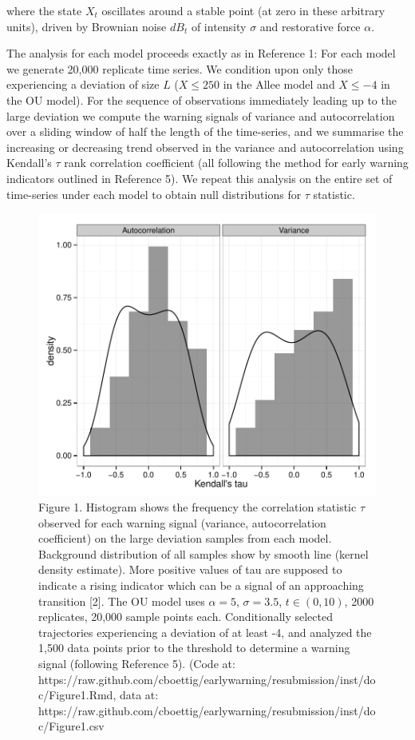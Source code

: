 \documentclass{article}
\begin{document}
where the state $X_t$ oscillates around a stable point (at zero in these
arbitrary units), driven by Brownian noise $dB_t$ of intensity $\sigma$
and restorative force $\alpha$.

The analysis for each model proceeds exactly as in Reference 1: For each
model we generate 20,000 replicate time series. We condition upon only
those experiencing a deviation of size $L$ ($X \leq 250$ in the Allee
model and $X \leq -4$ in the OU model). For the sequence of observations
immediately leading up to the large deviation we compute the warning
signals of variance and autocorrelation over a sliding window of half
the length of the time-series, and we summarise the increasing or
decreasing trend observed in the variance and autocorrelation using
Kendall's $\tau$ rank correlation coefficient (all following the method
for early warning indicators outlined in Reference 5). We repeat this
analysis on the entire set of time-series under each model to obtain
null distributions for $\tau$ statistic.

\begin{figure}[htbp]
\centering
\includegraphics{Figure1.pdf}
\caption{Figure 1. Histogram shows the frequency the correlation
statistic $\tau$ observed for each warning signal (variance,
autocorrelation coefficient) on the large deviation samples from each
model. Background distribution of all samples show by smooth line
(kernel density estimate). More positive values of tau are supposed to
indicate a rising indicator which can be a signal of an approaching
transition {[}2{]}. The OU model uses $\alpha = 5$, $\sigma=3.5$,
$t \in (0, 10)$, 2000 replicates, 20,000 sample points each.
Conditionally selected trajectories experiencing a deviation of at least
-4, and analyzed the 1,500 data points prior to the threshold to
determine a warning signal (following Reference 5). (Code at:
https://raw.github.com/cboettig/earlywarning/resubmission/inst/doc/Figure1.Rmd,
data at:
https://raw.github.com/cboettig/earlywarning/resubmission/inst/doc/Figure1.csv}
\end{figure}
\end{document}
